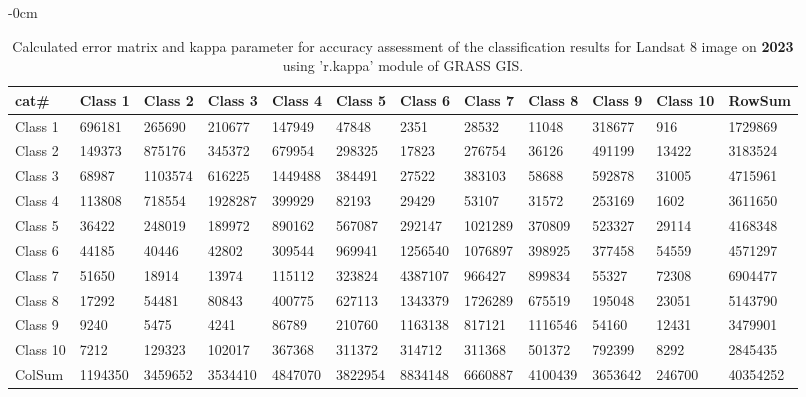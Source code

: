 \documentclass[sustainability,article,submit,pdftex,moreauthors]{Definitions/mdpi}
\begin{document}
\begin{table}[H] 
\footnotesize
    \centering
    \begin{adjustwidth}{-\extralength}{0cm}
    \caption{Calculated error matrix and kappa parameter for accuracy assessment of the classification results for Landsat 8 image on \textbf{2023} using 'r.kappa' module of GRASS GIS.\label{tab03}}
 	\begin{tabularx}{\fulllength}{|l|l|l|l|l|l|l|l|l|l|l|l|}
    \toprule
        \textbf{cat\#} & \textbf{Class 1} & \textbf{Class 2} & \textbf{Class 3} & \textbf{Class 4} & \textbf{Class 5} & \textbf{Class 6} & \textbf{Class 7} & \textbf{Class 8} & \textbf{Class 9} & \textbf{Class 10} & \textbf{RowSum} \\ \hline
        Class 1 & \cellcolor{green!20}696181 & 265690 & 210677 & 147949 & 47848 & 2351 & 28532 & 11048 & 318677 & 916 & 1729869 \\ \hline
        Class 2 & 149373 & \cellcolor{green!20}875176 & 345372 & 679954 & 298325 & 17823 & 276754 & 36126 & 491199 & 13422 & 3183524 \\ \hline
        Class 3 & 68987 & 1103574 & \cellcolor{green!20}616225 & 1449488 & 384491 & 27522 & 383103 & 58688 & 592878 & 31005 & 4715961 \\ \hline
        Class 4 & 113808 & 718554 & 1928287 & \cellcolor{green!20}399929 & 82193 & 29429 & 53107 & 31572 & 253169 & 1602 & 3611650 \\ \hline
        Class 5 & 36422 & 248019 & 189972 & 890162 & \cellcolor{green!20}567087 & 292147 & 1021289 & 370809 & 523327 & 29114 & 4168348 \\ \hline
        Class 6 & 44185 & 40446 & 42802 & 309544 & 969941 & \cellcolor{green!20}1256540 & 1076897 & 398925 & 377458 & 54559 & 4571297 \\ \hline
        Class 7 & 51650 & 18914 & 13974 & 115112 & 323824 & 4387107 & \cellcolor{green!20}966427 & 899834 & 55327 & 72308 & 6904477 \\ \hline
        Class 8 & 17292 & 54481 & 80843 & 400775 & 627113 & 1343379 & 1726289 & \cellcolor{green!20}675519 & 195048 & 23051 & 5143790 \\ \hline
        Class 9 & 9240 & 5475 & 4241 & 86789 & 210760 & 1163138 & 817121 & 1116546 & \cellcolor{green!20}54160 & 12431 & 3479901 \\ \hline
        Class 10 & 7212 & 129323 & 102017 & 367368 & 311372 & 314712 & 311368 & 501372 & 792399 & \cellcolor{green!20}8292 & 2845435 \\ \hline
        ColSum & 1194350 & 3459652 & 3534410 & 4847070 & 3822954 & 8834148 & 6660887 & 4100439 & 3653642 & 246700 & \cellcolor{green!20}40354252 \\ \hline
     \bottomrule
    \end{tabularx}
    \end{adjustwidth}
\end{table}
\end{document}
